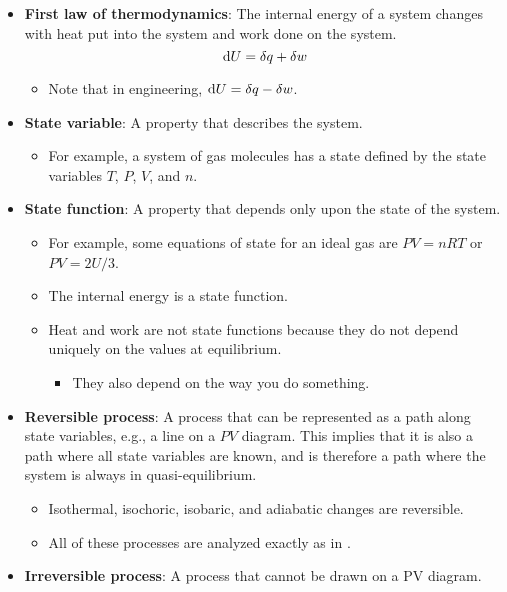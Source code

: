 \documentclass[../notes.tex]{subfiles}
\begin{document}
\begin{itemize}
\begin{itemize}
    \end{itemize}
    \item \textbf{First law of thermodynamics}: The internal energy of a system changes with heat put into the system and work done on the system.
    \begin{equation*}
        \dd{U} = \var{q}+\var{w}
    \end{equation*}
    \begin{itemize}
        \item Note that in engineering, $\dd{U}=\var{q}-\var{w}$.
    \end{itemize}
    \item \textbf{State variable}: A property that describes the system.
    \begin{itemize}
        \item For example, a system of gas molecules has a state defined by the state variables $T$, $P$, $V$, and $n$.
    \end{itemize}
    \item \textbf{State function}: A property that depends only upon the state of the system.
    \begin{itemize}
        \item For example, some equations of state for an ideal gas are $PV=nRT$ or $PV=2U/3$.
        \item The internal energy is a state function.
        \item Heat and work are not state functions because they do not depend uniquely on the values at equilibrium.
        \begin{itemize}
            \item They also depend on the way you do something.
        \end{itemize}
    \end{itemize}
    \item \textbf{Reversible process}: A process that can be represented as a path along state variables, e.g., a line on a $PV$ diagram. This implies that it is also a path where all state variables are known, and is therefore a path where the system is always in quasi-equilibrium.
    \begin{itemize}
        \item Isothermal, isochoric, isobaric, and adiabatic changes are reversible.
        \item All of these processes are analyzed exactly as in \textcite{bib:PHYS13300Notes}.
    \end{itemize}
    \item \textbf{Irreversible process}: A process that cannot be drawn on a PV diagram.

\end{itemize}
\end{document}
